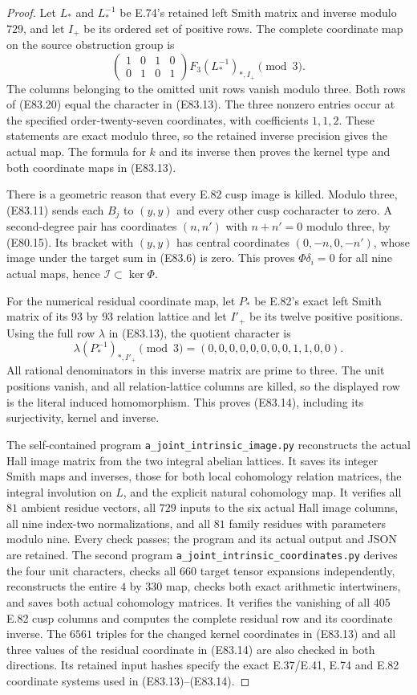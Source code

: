 \begin{proof}
Let $L_*$ and $L_*^{-1}$ be E.74's retained
left Smith matrix and inverse modulo $729$,
and let $I_+$ be its ordered set of positive
rows. The complete coordinate map on the
source obstruction group is
\[
 \begin{pmatrix}1&0&1&0\\0&1&0&1\end{pmatrix}
      F_3(L_*^{-1})_{*,I_+}\pmod3.
 \tag{E83.20}
\]
The columns belonging to the omitted unit
rows vanish modulo three. Both rows of
(E83.20) equal the character in (E83.13).
The three nonzero entries occur at the
specified order-twenty-seven coordinates,
with coefficients $1,1,2$. These statements
are exact modulo three, so the retained
inverse precision gives the actual map.
The formula for $k$ and its inverse then
proves the kernel type and both coordinate
maps in (E83.13).

There is a geometric reason that every E.82
cusp image is killed. Modulo three, (E83.11)
sends each $B_j$ to $(y,y)$ and every other
cusp cocharacter to zero. A second-degree
pair has coordinates $(n,n')$ with
$n+n'=0$ modulo three, by (E80.15).
Its bracket with $(y,y)$ has central
coordinates $(0,-n,0,-n')$, whose image
under the target sum in (E83.6) is zero.
This proves $\Phi\delta_i=0$ for all nine
actual maps, hence $\mathscr I\subset\ker\Phi$.

For the numerical residual coordinate map,
let $P_*$ be E.82's exact left Smith matrix
of its $93$ by $93$ relation lattice and
let $I'_+$ be its twelve positive positions.
Using the full row $\lambda$ in (E83.13),
the quotient character is
\[
             \lambda(P_*^{-1})_{*,I'_+}\pmod3
                 =(0,0,0,0,0,0,0,0,1,1,0,0).
 \tag{E83.21}
\]
All rational denominators in this inverse
matrix are prime to three. The unit positions
vanish, and all relation-lattice columns are
killed, so the displayed row is the literal
induced homomorphism. This proves (E83.14),
including its surjectivity, kernel and inverse.

The self-contained program
\texttt{a\_joint\_intrinsic\_image.py} reconstructs
the actual Hall image matrix from the two
integral abelian lattices. It saves its integer
Smith maps and inverses, those for both local
cohomology relation matrices, the integral
involution on $L$, and the explicit natural
cohomology map. It verifies all $81$ ambient
residue vectors, all $729$ inputs to the six
actual Hall image columns, all nine index-two
normalizations, and all $81$ family residues
with parameters modulo nine. Every check passes;
the program and its actual output and JSON
are retained.
The second program
\texttt{a\_joint\_intrinsic\_coordinates.py}
derives the four unit characters, checks all
$660$ target tensor expansions independently,
reconstructs the entire $4$ by $330$ map,
checks both exact arithmetic intertwiners,
and saves both actual cohomology matrices.
It verifies the vanishing of all $405$
E.82 cusp columns and computes the complete
residual row and its coordinate inverse.
The $6561$ triples for the changed kernel
coordinates in (E83.13) and all three values
of the residual coordinate in (E83.14) are
also checked in both directions.
Its retained input hashes specify the exact
E.37/E.41, E.74 and E.82 coordinate systems
used in (E83.13)--(E83.14).
\end{proof}
